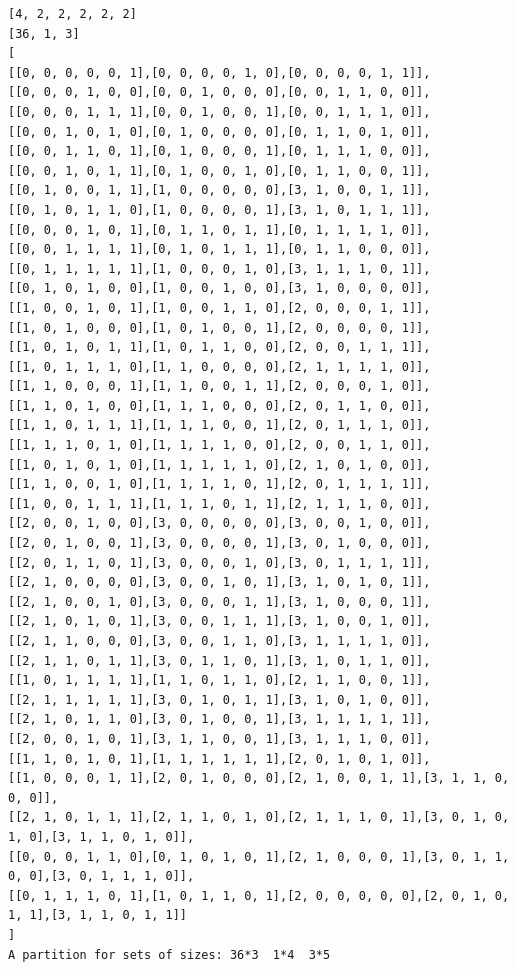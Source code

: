 \documentclass[final]{dmtcs-episciences}
\begin{document}
\begin{appendices}
\begin{verbatim} 
[4, 2, 2, 2, 2, 2]
[36, 1, 3]
[
[[0, 0, 0, 0, 0, 1],[0, 0, 0, 0, 1, 0],[0, 0, 0, 0, 1, 1]],
[[0, 0, 0, 1, 0, 0],[0, 0, 1, 0, 0, 0],[0, 0, 1, 1, 0, 0]],
[[0, 0, 0, 1, 1, 1],[0, 0, 1, 0, 0, 1],[0, 0, 1, 1, 1, 0]],
[[0, 0, 1, 0, 1, 0],[0, 1, 0, 0, 0, 0],[0, 1, 1, 0, 1, 0]],
[[0, 0, 1, 1, 0, 1],[0, 1, 0, 0, 0, 1],[0, 1, 1, 1, 0, 0]],
[[0, 0, 1, 0, 1, 1],[0, 1, 0, 0, 1, 0],[0, 1, 1, 0, 0, 1]],
[[0, 1, 0, 0, 1, 1],[1, 0, 0, 0, 0, 0],[3, 1, 0, 0, 1, 1]],
[[0, 1, 0, 1, 1, 0],[1, 0, 0, 0, 0, 1],[3, 1, 0, 1, 1, 1]],
[[0, 0, 0, 1, 0, 1],[0, 1, 1, 0, 1, 1],[0, 1, 1, 1, 1, 0]],
[[0, 0, 1, 1, 1, 1],[0, 1, 0, 1, 1, 1],[0, 1, 1, 0, 0, 0]],
[[0, 1, 1, 1, 1, 1],[1, 0, 0, 0, 1, 0],[3, 1, 1, 1, 0, 1]],
[[0, 1, 0, 1, 0, 0],[1, 0, 0, 1, 0, 0],[3, 1, 0, 0, 0, 0]],
[[1, 0, 0, 1, 0, 1],[1, 0, 0, 1, 1, 0],[2, 0, 0, 0, 1, 1]],
[[1, 0, 1, 0, 0, 0],[1, 0, 1, 0, 0, 1],[2, 0, 0, 0, 0, 1]],
[[1, 0, 1, 0, 1, 1],[1, 0, 1, 1, 0, 0],[2, 0, 0, 1, 1, 1]],
[[1, 0, 1, 1, 1, 0],[1, 1, 0, 0, 0, 0],[2, 1, 1, 1, 1, 0]],
[[1, 1, 0, 0, 0, 1],[1, 1, 0, 0, 1, 1],[2, 0, 0, 0, 1, 0]],
[[1, 1, 0, 1, 0, 0],[1, 1, 1, 0, 0, 0],[2, 0, 1, 1, 0, 0]],
[[1, 1, 0, 1, 1, 1],[1, 1, 1, 0, 0, 1],[2, 0, 1, 1, 1, 0]],
[[1, 1, 1, 0, 1, 0],[1, 1, 1, 1, 0, 0],[2, 0, 0, 1, 1, 0]],
[[1, 0, 1, 0, 1, 0],[1, 1, 1, 1, 1, 0],[2, 1, 0, 1, 0, 0]],
[[1, 1, 0, 0, 1, 0],[1, 1, 1, 1, 0, 1],[2, 0, 1, 1, 1, 1]],
[[1, 0, 0, 1, 1, 1],[1, 1, 1, 0, 1, 1],[2, 1, 1, 1, 0, 0]],
[[2, 0, 0, 1, 0, 0],[3, 0, 0, 0, 0, 0],[3, 0, 0, 1, 0, 0]],
[[2, 0, 1, 0, 0, 1],[3, 0, 0, 0, 0, 1],[3, 0, 1, 0, 0, 0]],
[[2, 0, 1, 1, 0, 1],[3, 0, 0, 0, 1, 0],[3, 0, 1, 1, 1, 1]],
[[2, 1, 0, 0, 0, 0],[3, 0, 0, 1, 0, 1],[3, 1, 0, 1, 0, 1]],
[[2, 1, 0, 0, 1, 0],[3, 0, 0, 0, 1, 1],[3, 1, 0, 0, 0, 1]],
[[2, 1, 0, 1, 0, 1],[3, 0, 0, 1, 1, 1],[3, 1, 0, 0, 1, 0]],
[[2, 1, 1, 0, 0, 0],[3, 0, 0, 1, 1, 0],[3, 1, 1, 1, 1, 0]],
[[2, 1, 1, 0, 1, 1],[3, 0, 1, 1, 0, 1],[3, 1, 0, 1, 1, 0]],
[[1, 0, 1, 1, 1, 1],[1, 1, 0, 1, 1, 0],[2, 1, 1, 0, 0, 1]],
[[2, 1, 1, 1, 1, 1],[3, 0, 1, 0, 1, 1],[3, 1, 0, 1, 0, 0]],
[[2, 1, 0, 1, 1, 0],[3, 0, 1, 0, 0, 1],[3, 1, 1, 1, 1, 1]],
[[2, 0, 0, 1, 0, 1],[3, 1, 1, 0, 0, 1],[3, 1, 1, 1, 0, 0]],
[[1, 1, 0, 1, 0, 1],[1, 1, 1, 1, 1, 1],[2, 0, 1, 0, 1, 0]],
[[1, 0, 0, 0, 1, 1],[2, 0, 1, 0, 0, 0],[2, 1, 0, 0, 1, 1],[3, 1, 1, 0, 0, 0]],
[[2, 1, 0, 1, 1, 1],[2, 1, 1, 0, 1, 0],[2, 1, 1, 1, 0, 1],[3, 0, 1, 0, 1, 0],[3, 1, 1, 0, 1, 0]],
[[0, 0, 0, 1, 1, 0],[0, 1, 0, 1, 0, 1],[2, 1, 0, 0, 0, 1],[3, 0, 1, 1, 0, 0],[3, 0, 1, 1, 1, 0]],
[[0, 1, 1, 1, 0, 1],[1, 0, 1, 1, 0, 1],[2, 0, 0, 0, 0, 0],[2, 0, 1, 0, 1, 1],[3, 1, 1, 0, 1, 1]]
]
A partition for sets of sizes: 36*3  1*4  3*5
\end{verbatim}
\newpage


\end{appendices}
\end{document}
